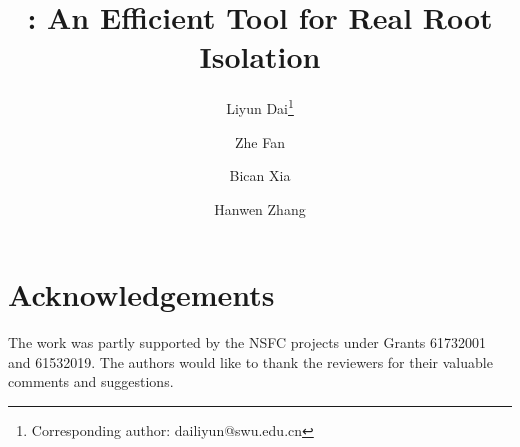 \documentclass[10pt,a4paper]{article}
\begin{document}
	
	\title{\froot: An Efficient Tool for Real Root Isolation}
		
		\author[1]{Liyun Dai\thanks{Corresponding author: dailiyun@swu.edu.cn}}
		\author[2]{Zhe Fan} %
		\author[2]{Bican Xia} %
		\author[2]{Hanwen Zhang} %
	
	
	\renewcommand\Authands{ and }
\date{}
\maketitle















%
%



\section*{Acknowledgements}
The work was partly supported by the NSFC projects under Grants 61732001 and 61532019. The authors would like to thank the reviewers for their valuable comments and suggestions.




\end{document}
